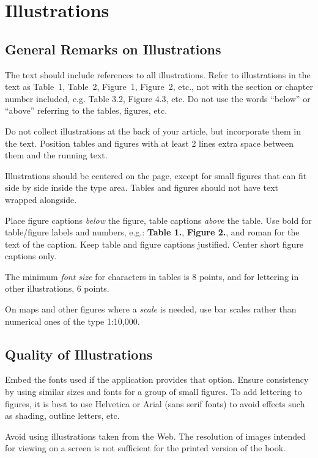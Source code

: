 \documentclass{IOS-Book-Article}
\begin{document}
\section{Illustrations}

\subsection{General Remarks on Illustrations}
The text should include references to all illustrations. Refer to illustrations in the
text as Table~1, Table~2, Figure~1, Figure~2, etc., not with the section or chapter number
included, e.g. Table 3.2, Figure 4.3, etc. Do not use the words ``below'' or ``above''
referring to the tables, figures, etc.

Do not collect illustrations at the back of your article, but incorporate them in the
text. Position tables and figures with at least 2 lines
extra space between them and the running text.

Illustrations should be centered on the page, except for small figures that can fit
side by side inside the type area. Tables and figures should not have text wrapped
alongside.

Place figure captions \textit{below} the figure, table captions \textit{above} the table.
Use bold for table/figure labels and numbers, e.g.: \textbf{Table 1.}, \textbf{Figure 2.},
and roman for the text of the caption. Keep table and figure captions justified. Center
short figure captions only.

The minimum \textit{font size} for characters in tables is 8 points, and for lettering in other
illustrations, 6 points.

On maps and other figures where a \textit{scale} is needed, use bar scales rather than
numerical ones of the type 1:10,000.

\subsection{Quality of Illustrations}
Embed the fonts used if the application provides that option.
Ensure consistency by using similar sizes and fonts for a group of small figures.
To add lettering to figures, it is best to use Helvetica or Arial (sans serif fonts)
to avoid effects such as shading, outline letters, etc.

 Avoid using illustrations
taken from the Web. The resolution of images intended for viewing on a screen is
not sufficient for the printed version of the book.
\end{document}
